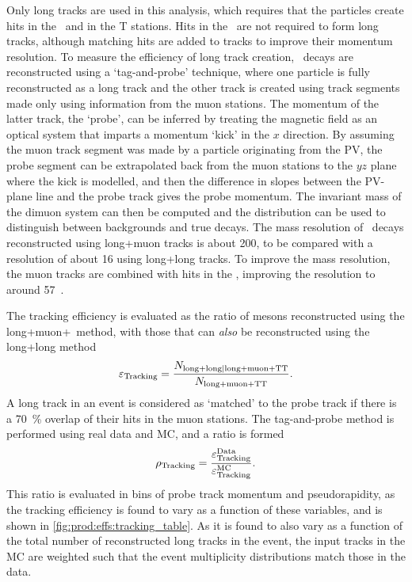 Only long tracks are used in this analysis, which requires that the particles
create hits in the \velo\ and in the T stations.
Hits in the \ttracker\ are not required to form long tracks, although matching
hits are added to tracks to improve their momentum resolution.
To measure the efficiency of long track creation, \JpsiTomumu\ decays are
reconstructed using a `tag-and-probe' technique, where one particle is fully
reconstructed as a long track and the other track is created using track
segments made only using information from the muon stations.
The momentum of the latter track, the `probe', can be inferred by treating the
magnetic field as an optical system that imparts a momentum `kick' in the $x$
direction.
By assuming the muon track segment was made by a particle originating from the
\ac{PV}, the probe segment can be extrapolated back from the muon stations to
the $yz$ plane where the kick is modelled, and then the difference in slopes
between the \ac{PV}-plane line and the probe track gives the probe momentum.
The invariant mass of the dimuon system can then be computed and the
distribution can be used to distinguish between backgrounds and true \PJpsi
decays.
The mass resolution of \JpsiTomumu\ decays reconstructed using long+muon tracks
is about \SI{200}{\MeVcc}, to be compared with a resolution of about
\SI{16}{\MeVcc} using long+long tracks.
To improve the mass resolution, the muon tracks are combined with hits in the
\ttracker, improving the resolution to around
\SI{57}{\MeVcc}~\cite{Aaij:2014pwa,DeCian:2013zua}.

The tracking efficiency is evaluated as the ratio of \PJpsi mesons
reconstructed using the long+muon+\ttracker\ method, with those that can
\emph{also} be reconstructed using the long+long method
\begin{equation}
  \eff_{\text{Tracking}} =
  \frac{%
    N_{\text{long+long}|\text{long+muon+TT}}
  }{%
    N_{\text{long+muon+TT}}
  }.
  \label{eqn:prod:effs:tracking_eff}
\end{equation}
A long track in an event is considered as `matched' to the probe track if there
is a \SI{70}{\percent} overlap of their hits in the muon stations.
The tag-and-probe method is performed using real data and \ac{MC}, and a ratio
is formed
\begin{equation}
  \efftracking = \frac{%
    \eff_{\text{Tracking}}^{\text{Data}}
  }{%
    \eff_{\text{Tracking}}^{\text{MC}}
  }.
  \label{eqn:prod:effs:tracking_ratio}
\end{equation}
This ratio is evaluated in bins of probe track momentum and
pseudorapidity, as the tracking efficiency is found to vary as a function
of these variables, and is shown in \cref{fig:prod:effs:tracking_table}.
As it is found to also vary as a function of the total number of reconstructed
long tracks in the event, the input tracks in the \ac{MC} are weighted such
that the event multiplicity distributions match those in the data.

